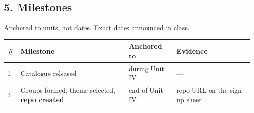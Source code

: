 \documentclass[11pt]{article}
\begin{document}
\hypertarget{milestones}{%
\subsection{5. Milestones}\label{milestones}}

Anchored to units, not dates. Exact dates announced in class.

{\footnotesize
\begin{longtable}[]{@{}llll@{}}
\toprule
\begin{minipage}[b]{0.22\columnwidth}\raggedright
\#\strut
\end{minipage} & \begin{minipage}[b]{0.22\columnwidth}\raggedright
Milestone\strut
\end{minipage} & \begin{minipage}[b]{0.22\columnwidth}\raggedright
Anchored to\strut
\end{minipage} & \begin{minipage}[b]{0.22\columnwidth}\raggedright
Evidence\strut
\end{minipage}\tabularnewline
\midrule
\endhead
\begin{minipage}[t]{0.22\columnwidth}\raggedright
1\strut
\end{minipage} & \begin{minipage}[t]{0.22\columnwidth}\raggedright
Catalogue released\strut
\end{minipage} & \begin{minipage}[t]{0.22\columnwidth}\raggedright
during Unit IV\strut
\end{minipage} & \begin{minipage}[t]{0.22\columnwidth}\raggedright
---\strut
\end{minipage}\tabularnewline
\begin{minipage}[t]{0.22\columnwidth}\raggedright
2\strut
\end{minipage} & \begin{minipage}[t]{0.22\columnwidth}\raggedright
Groups formed, theme selected, \textbf{repo created}\strut
\end{minipage} & \begin{minipage}[t]{0.22\columnwidth}\raggedright
end of Unit IV\strut
\end{minipage} & \begin{minipage}[t]{0.22\columnwidth}\raggedright
repo URL on the sign-up sheet\strut
\end{minipage}\tabularnewline
\begin{minipage}[t]{0.22\columnwidth}\raggedright

\end{minipage}
\end{longtable}}
\end{document}
